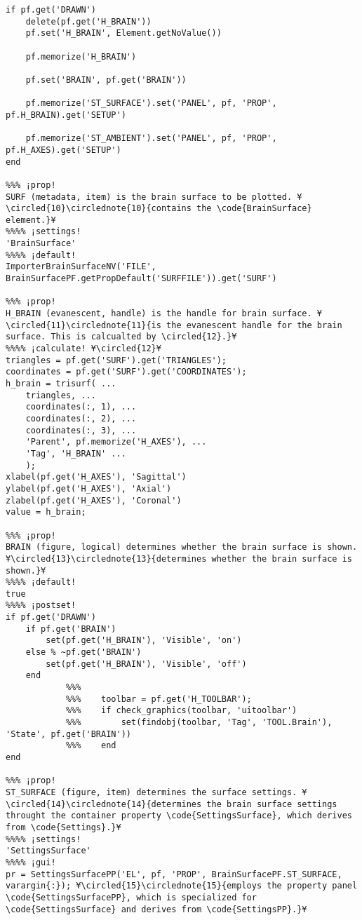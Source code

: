 \documentclass{tufte-handout}
\begin{document}
\begin{lstlisting}
if pf.get('DRAWN')
    delete(pf.get('H_BRAIN'))
    pf.set('H_BRAIN', Element.getNoValue())

    pf.memorize('H_BRAIN')

    pf.set('BRAIN', pf.get('BRAIN'))

    pf.memorize('ST_SURFACE').set('PANEL', pf, 'PROP', pf.H_BRAIN).get('SETUP')

    pf.memorize('ST_AMBIENT').set('PANEL', pf, 'PROP', pf.H_AXES).get('SETUP')
end

%%% ¡prop!
SURF (metadata, item) is the brain surface to be plotted. ¥\circled{10}\circlednote{10}{contains the \code{BrainSurface} element.}¥
%%%% ¡settings!
'BrainSurface'
%%%% ¡default!
ImporterBrainSurfaceNV('FILE', BrainSurfacePF.getPropDefault('SURFFILE')).get('SURF')

%%% ¡prop!
H_BRAIN (evanescent, handle) is the handle for brain surface. ¥\circled{11}\circlednote{11}{is the evanescent handle for the brain surface. This is calcualted by \circled{12}.}¥
%%%% ¡calculate! ¥\circled{12}¥
triangles = pf.get('SURF').get('TRIANGLES');
coordinates = pf.get('SURF').get('COORDINATES');
h_brain = trisurf( ...
    triangles, ...
    coordinates(:, 1), ...
    coordinates(:, 2), ...
    coordinates(:, 3), ...
    'Parent', pf.memorize('H_AXES'), ...
    'Tag', 'H_BRAIN' ...
    );
xlabel(pf.get('H_AXES'), 'Sagittal')
ylabel(pf.get('H_AXES'), 'Axial')
zlabel(pf.get('H_AXES'), 'Coronal')
value = h_brain;

%%% ¡prop!
BRAIN (figure, logical) determines whether the brain surface is shown. ¥\circled{13}\circlednote{13}{determines whether the brain surface is shown.}¥
%%%% ¡default!
true
%%%% ¡postset!
if pf.get('DRAWN')
    if pf.get('BRAIN')
        set(pf.get('H_BRAIN'), 'Visible', 'on')
    else % ~pf.get('BRAIN') 
        set(pf.get('H_BRAIN'), 'Visible', 'off')
    end
            %%%
            %%%    toolbar = pf.get('H_TOOLBAR');
            %%%    if check_graphics(toolbar, 'uitoolbar')
            %%%        set(findobj(toolbar, 'Tag', 'TOOL.Brain'), 'State', pf.get('BRAIN'))
            %%%    end
end

%%% ¡prop!
ST_SURFACE (figure, item) determines the surface settings. ¥\circled{14}\circlednote{14}{determines the brain surface settings throught the container property \code{SettingsSurface}, which derives from \code{Settings}.}¥
%%%% ¡settings!
'SettingsSurface'
%%%% ¡gui!
pr = SettingsSurfacePP('EL', pf, 'PROP', BrainSurfacePF.ST_SURFACE, varargin{:}); ¥\circled{15}\circlednote{15}{employs the property panel \code{SettingsSurfacePP}, which is specialized for \code{SettingsSurface} and derives from \code{SettingsPP}.}¥


\end{lstlisting}
\end{document}
